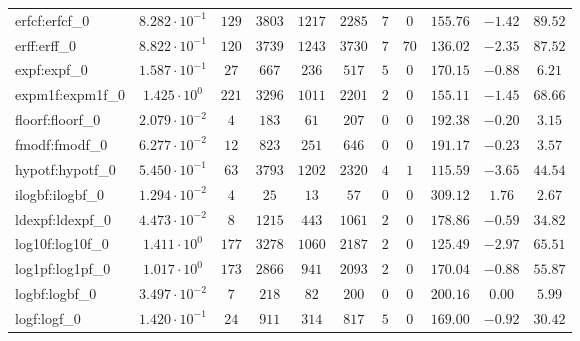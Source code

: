 \begin{tabular}{|l|c|c|c|c|c|c|c|c|c|c|}
erfcf:erfcf\_0               & $ 8.282 \cdot 10^{-1} $ & $ 129    $ & $ 3803  $ & $ 1217  $ & $ 2285  $ & $ 7   $ & $ 0   $ & $ 155.76      $ & $ -1.42   $ & $ 89.52   $ \\
erff:erff\_0                 & $ 8.822 \cdot 10^{-1} $ & $ 120    $ & $ 3739  $ & $ 1243  $ & $ 3730  $ & $ 7   $ & $ 70  $ & $ 136.02      $ & $ -2.35   $ & $ 87.52   $ \\
expf:expf\_0                 & $ 1.587 \cdot 10^{-1} $ & $ 27     $ & $ 667   $ & $ 236   $ & $ 517   $ & $ 5   $ & $ 0   $ & $ 170.15      $ & $ -0.88   $ & $ 6.21    $ \\
expm1f:expm1f\_0             & $ 1.425 \cdot 10^{0}  $ & $ 221    $ & $ 3296  $ & $ 1011  $ & $ 2201  $ & $ 2   $ & $ 0   $ & $ 155.11      $ & $ -1.45   $ & $ 68.66   $ \\
floorf:floorf\_0             & $ 2.079 \cdot 10^{-2} $ & $ 4      $ & $ 183   $ & $ 61    $ & $ 207   $ & $ 0   $ & $ 0   $ & $ 192.38      $ & $ -0.20   $ & $ 3.15    $ \\
fmodf:fmodf\_0               & $ 6.277 \cdot 10^{-2} $ & $ 12     $ & $ 823   $ & $ 251   $ & $ 646   $ & $ 0   $ & $ 0   $ & $ 191.17      $ & $ -0.23   $ & $ 3.57    $ \\
hypotf:hypotf\_0             & $ 5.450 \cdot 10^{-1} $ & $ 63     $ & $ 3793  $ & $ 1202  $ & $ 2320  $ & $ 4   $ & $ 1   $ & $ 115.59      $ & $ -3.65   $ & $ 44.54   $ \\
ilogbf:ilogbf\_0             & $ 1.294 \cdot 10^{-2} $ & $ 4      $ & $ 25    $ & $ 13    $ & $ 57    $ & $ 0   $ & $ 0   $ & $ 309.12      $ & $ 1.76    $ & $ 2.67    $ \\
ldexpf:ldexpf\_0             & $ 4.473 \cdot 10^{-2} $ & $ 8      $ & $ 1215  $ & $ 443   $ & $ 1061  $ & $ 2   $ & $ 0   $ & $ 178.86      $ & $ -0.59   $ & $ 34.82   $ \\
log10f:log10f\_0             & $ 1.411 \cdot 10^{0}  $ & $ 177    $ & $ 3278  $ & $ 1060  $ & $ 2187  $ & $ 2   $ & $ 0   $ & $ 125.49      $ & $ -2.97   $ & $ 65.51   $ \\
log1pf:log1pf\_0             & $ 1.017 \cdot 10^{0}  $ & $ 173    $ & $ 2866  $ & $ 941   $ & $ 2093  $ & $ 2   $ & $ 0   $ & $ 170.04      $ & $ -0.88   $ & $ 55.87   $ \\
logbf:logbf\_0               & $ 3.497 \cdot 10^{-2} $ & $ 7      $ & $ 218   $ & $ 82    $ & $ 200   $ & $ 0   $ & $ 0   $ & $ 200.16      $ & $ 0.00    $ & $ 5.99    $ \\
logf:logf\_0                 & $ 1.420 \cdot 10^{-1} $ & $ 24     $ & $ 911   $ & $ 314   $ & $ 817   $ & $ 5   $ & $ 0   $ & $ 169.00      $ & $ -0.92   $ & $ 30.42   $ \\

\end{tabular}
